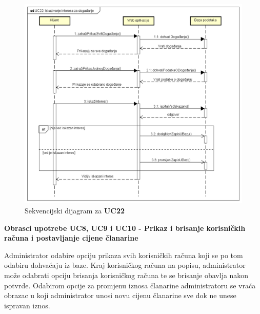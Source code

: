 				\begin{figure}[H]
					\includegraphics[width=\textwidth]{dijagrami/sd3.PNG}
					\centering
					\caption{Sekvencijski dijagram za \textbf{UC22}}
					\label{fig:promjene}
				\end{figure}
				
				\newpage
				
				\noindent \textbf{Obrasci upotrebe UC8, UC9 i UC10 - Prikaz i brisanje korisničkih računa i postavljanje cijene članarine}
				
				\noindent Administrator odabire opciju prikaza svih korisničkih računa koji se po tom odabiru dohvaćaju iz baze. Kraj korisničkog računa na popisu, administrator može odabrati opciju brisanja korisničkog računa te se brisanje obavlja nakon potvrde. Odabirom opcije za promjenu iznosa članarine administratoru se vraća obrazac u koji administrator unosi novu cijenu članarine sve dok ne unese ispravan iznos.
				
				\vspace{-0.3cm}
				
